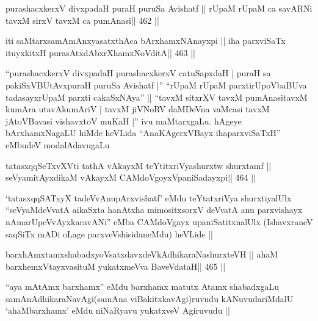

\begin{shl}
purashacxkerxV divxpadaH puraH puruSa Avishatf ||
rUpaM rUpaM ca savARNi tavxM sirxV tavxM ca pumAnasi\hfill || 462 ||
\end{shl}

\begin{shl}
iti saMtarxsamAmAnxyasatxthAca bArxhamxNAnayxpi ||
iha parxviSaTx ituyxkitxH purasAtxdAbxrXhamxNoVditA\hfill || 463 ||
\end{shl}

\begin{artha}
``purashacxkerxV divxpadaH purashacxkerxV catuSapxdaH | puraH sa
  pakiSxVBUtAvxpuraH puruSa Avishatf |'' ``rUpaM rUpaM
  parxtirUpoVbaBUva tadasayxrUpaM parxti cakaSxNAya'' ||  ``tavxM
  sitxrXV tavxM pumAnasitavxM kumAra utavAkumAriV | tavxM jiVNoRV
  daMDeVna vaMcasi tavxM jAtoVBavasi vishavxtoV muKaH |'' ivu
  maMtarxgaLu. hAgeye bArxhamxNagaLU hiMde heVLida ``AnaKAgerxVBayx
  ihaparxviSaTxH'' eMbudeV modalAdavugaLu 
\end{artha}

\begin{shl}
tatasxqqSeTxvXVti tathA vAkayxM teYtitxriVyashurxtw shurxtamf ||
seVyamitAyxdikaM vAkayxM CAMdoVgoyxVpaniSadayxpi\hfill || 464 ||
\end{shl}

\begin{artha}
`tatasxqqSATxyX tadeVvAnupArxvishatf' eMdu teYtatxriVya shurxtiyalUlx
  ``seVyaMdeVvatA aikaSxta hanAtxha mimositxsorxV deVvatA anu
  parxvishayx nAmarUpeVvAyxkaravANi'' eMba CAMdoVgayx
  upaniSatitxnalUlx (IshavxraneV saqSiTx mADi oLage
  parxveVshisidaneMdu) heVLide || 
\end{artha}



\begin{shl}
barxhAmxtamxshabadxyoVsatxdavxdeVkAdhikaraNashurxteVH ||
ahaM barxhemxVtayxvasituM yukatxmeVva BaveVdataH\hfill || 465 ||
\end{shl}

\begin{artha}
``aya mAtAmx barxhamx'' eMdu barxhamx matutx Atamx shabadxgaLu
  samAnAdhikaraNavAgi(samAna viBakitxkavAgi)ruvudu kANuvudariMdalU
  `ahaMbarxhamx' eMdu niNaRyavu yukatxveV Agiruvudu ||
\end{artha}



